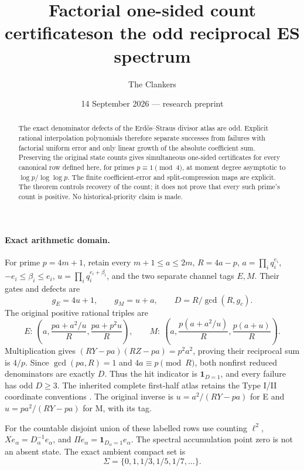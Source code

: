 \documentclass[10pt,a4paper]{article}
\title{Factorial one-sided count certificates\newline on the odd reciprocal ES spectrum}
\author{The Clankers}
\date{14 September 2026 --- research preprint}
\begin{document}
\maketitle
\begin{abstract}
The exact denominator defects of the Erd\H{o}s--Straus divisor atlas are odd.
Explicit rational interpolation polynomials therefore separate successes from
failures with factorial uniform error and only linear growth of the absolute
coefficient sum. Preserving the original state counts gives simultaneous
one-sided certificates for every canonical row defined here, for primes
$p\equiv1\pmod4$, at moment degree asymptotic to
$\log p/\log\log p$. The finite coefficient-error and split-compression maps
are explicit. The theorem controls recovery of the count; it does not prove
that every such prime's count is positive. No historical-priority claim is made.
\end{abstract}

\paragraph{Exact arithmetic domain.}
For prime $p=4m+1$, retain every $m+1\le a\le2m$, $R=4a-p$,
$a=\prod_iq_i^{e_i}$, $-e_i\le\beta_i\le e_i$, $u=\prod_iq_i^{e_i+\beta_i}$,
and the two separate channel tags $E,M$. Their gates and defects are
\[
 g_E=4u+1,\qquad g_M=u+a,\qquad D=R/\gcd(R,g_c).
\]
The original positive rational triples are
\[
 E:\ \left(a,\frac{pa+a^2/u}{R},\frac{pa+p^2u}{R}\right),\qquad
 M:\ \left(a,\frac{p(a+a^2/u)}R,\frac{p(a+u)}R\right).
\]
Multiplication gives $(RY-pa)(RZ-pa)=p^2a^2$, proving their reciprocal sum is
$4/p$. Since $\gcd(pa,R)=1$ and $4a\equiv p\pmod R$, both nonfirst reduced
denominators are exactly $D$. Thus the hit indicator is $\mathbf1_{D=1}$,
and every failure has odd $D\ge3$. The inherited complete first-half atlas
retains the Type I/II coordinate conventions \cite{ET,Prior}. The original
inverse is $u=a^2/(RY-pa)$ for E and $u=pa^2/(RY-pa)$ for M, with its tag.

For the countable disjoint union of these labelled rows use counting
$\ell^2$, $Xe_\alpha=D_\alpha^{-1}e_\alpha$, and
$\Pi e_\alpha=\mathbf1_{D_\alpha=1}e_\alpha$. The spectral accumulation
point zero is not an absent state. The exact ambient compact set is
\[
 \Sigma=\{0,1,1/3,1/5,1/7,\ldots\}.
\]
\end{document}
